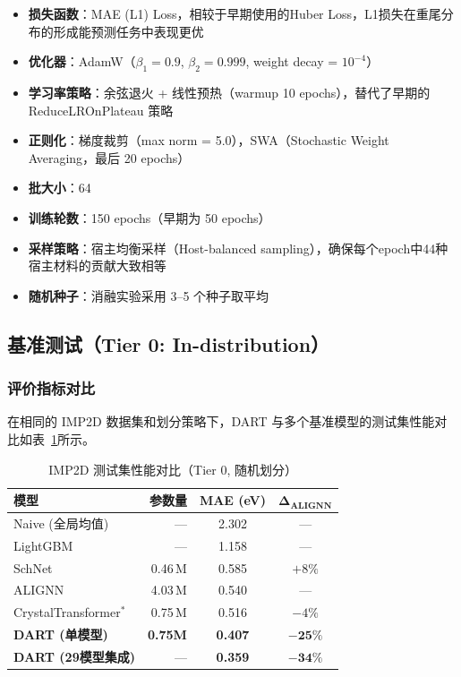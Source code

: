 \begin{itemize}
    \item \textbf{损失函数}：MAE (L1) Loss，相较于早期使用的Huber Loss，L1损失在重尾分布的形成能预测任务中表现更优
    \item \textbf{优化器}：AdamW（$\beta_1=0.9$, $\beta_2=0.999$, weight decay = $10^{-4}$）
    \item \textbf{学习率策略}：余弦退火 + 线性预热（warmup 10 epochs），替代了早期的 ReduceLROnPlateau 策略
    \item \textbf{正则化}：梯度裁剪（max norm = 5.0），SWA（Stochastic Weight Averaging，最后 20 epochs）
    \item \textbf{批大小}：64
    \item \textbf{训练轮数}：150 epochs（早期为 50 epochs）
    \item \textbf{采样策略}：宿主均衡采样（Host-balanced sampling），确保每个epoch中44种宿主材料的贡献大致相等
    \item \textbf{随机种子}：消融实验采用 3--5 个种子取平均
\end{itemize}

\subsection{基准测试（Tier 0: In-distribution）}

\subsubsection{评价指标对比}

在相同的 IMP2D 数据集和划分策略下，DART 与多个基准模型的测试集性能对比如表~\ref{tab:main_new}所示。

\begin{table}[h]
\centering
\caption{IMP2D 测试集性能对比（Tier 0, 随机划分）}
\label{tab:main_new}
\begin{tabular}{lrcc}
\toprule
\textbf{模型} & \textbf{参数量} & \textbf{MAE (eV)} & $\boldsymbol{\Delta}_{\textbf{ALIGNN}}$ \\
\midrule
Naive (全局均值) & --- & 2.302 & --- \\
LightGBM & --- & 1.158 & --- \\
SchNet & 0.46\,M & 0.585 & $+8\%$ \\
ALIGNN & 4.03\,M & 0.540 & --- \\
CrystalTransformer$^*$ & 0.75\,M & 0.516 & $-4\%$ \\
\midrule
\textbf{DART (单模型)} & \textbf{0.75M} & \textbf{0.407} & $\boldsymbol{-25\%}$ \\
\textbf{DART (29模型集成)} & --- & \textbf{0.359} & $\boldsymbol{-34\%}$ \\
\bottomrule
\end{tabular}
\end{table}

